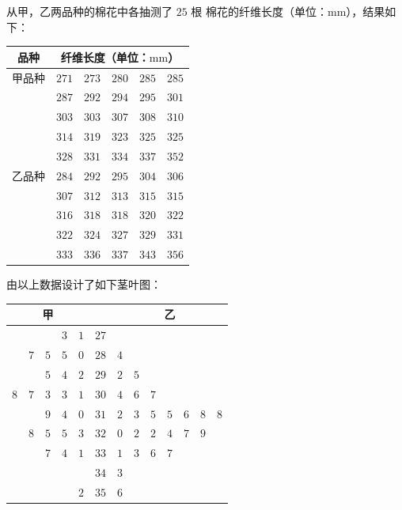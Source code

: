 \begin{problem}
从甲，乙两品种的棉花中各抽测了 \(25\text{ 根}\) 棉花的纤维长度（单位：\(\mathrm{mm}\)），结果如下：

\begin{center}
\begin{tabular}{c|ccccc}
\hline
品种 & \multicolumn{5}{c}{纤维长度（单位：\(\mathrm{mm}\)）} \\
\hline
甲品种 & \(271\) & \(273\) & \(280\) & \(285\) & \(285\) \\
 & \(287\) & \(292\) & \(294\) & \(295\) & \(301\) \\
 & \(303\) & \(303\) & \(307\) & \(308\) & \(310\) \\
 & \(314\) & \(319\) & \(323\) & \(325\) & \(325\) \\
 & \(328\) & \(331\) & \(334\) & \(337\) & \(352\) \\
\hline
乙品种 & \(284\) & \(292\) & \(295\) & \(304\) & \(306\) \\
 & \(307\) & \(312\) & \(313\) & \(315\) & \(315\) \\
 & \(316\) & \(318\) & \(318\) & \(320\) & \(322\) \\
 & \(322\) & \(324\) & \(327\) & \(329\) & \(331\) \\
 & \(333\) & \(336\) & \(337\) & \(343\) & \(356\) \\
\hline
\end{tabular}
\end{center}

由以上数据设计了如下茎叶图：
\begin{center}
\begin{tabular}{rrrrr|c|lllllll}
\multicolumn{5}{c|}{甲} & & \multicolumn{7}{c}{乙} \\
\hline
 &  &  & \(3\) & \(1\) & \(27\) &  &  &  &  &  &  &  \\
 & \(7\) & \(5\) & \(5\) & \(0\) & \(28\) & \(4\) &  &  &  &  &  &  \\
 &  & \(5\) & \(4\) & \(2\) & \(29\) & \(2\) & \(5\) &  &  &  &  &  \\
\(8\) & \(7\) & \(3\) & \(3\) & \(1\) & \(30\) & \(4\) & \(6\) & \(7\) &  &  &  &  \\
 &  & \(9\) & \(4\) & \(0\) & \(31\) & \(2\) & \(3\) & \(5\) & \(5\) & \(6\) & \(8\) & \(8\) \\
 & \(8\) & \(5\) & \(5\) & \(3\) & \(32\) & \(0\) & \(2\) & \(2\) & \(4\) & \(7\) & \(9\) &  \\
 &  & \(7\) & \(4\) & \(1\) & \(33\) & \(1\) & \(3\) & \(6\) & \(7\) &  &  &  \\
 &  &  &  &  & \(34\) & \(3\) &  &  &  &  &  &  \\
 &  &  &  & \(2\) & \(35\) & \(6\) &  &  &  &  &  &  \\
\end{tabular}
\end{center}


\end{problem}
